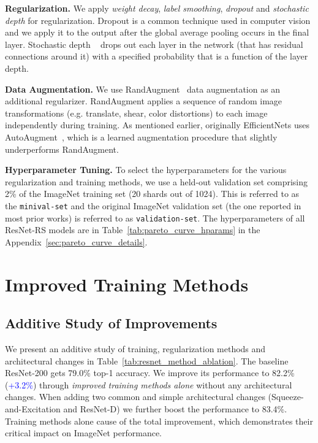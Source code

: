 \documentclass{article}
\begin{document}
\textbf{Regularization.}
We apply \emph{weight decay}, \emph{label smoothing}, \emph{dropout} and \emph{stochastic depth} for regularization. Dropout \cite{srivastava2014dropout} is a common technique used in computer vision and we apply it to the output after the global average pooling occurs in the final layer. 
Stochastic depth ~\cite{huang2016deep} drops out each layer in the network (that has residual connections around it) with a specified probability that is a function of the layer depth. 

\textbf{Data Augmentation.}
We use RandAugment~\cite{cubuk2019randaugment} data augmentation as an additional regularizer. 
RandAugment applies a sequence of random image transformations (e.g. translate, shear, color distortions) to each image independently during training.
As mentioned earlier, originally EfficientNets uses AutoAugment~\cite{cubuk2018autoaugment}, which is a learned augmentation procedure that slightly underperforms RandAugment.

\textbf{Hyperparameter Tuning.}
To select the hyperparameters for the various regularization and training methods, we use a held-out validation set comprising 2\% of the ImageNet training set (20 shards out of 1024).
This is referred to as the \texttt{minival-set} and the original ImageNet validation set (the one reported in most prior works) is referred to as \texttt{validation-set}. The hyperparameters of all ResNet-RS models are in Table~\ref{tab:pareto_curve_hparams} in the Appendix~\ref{sec:pareto_curve_details}. \section{Improved Training Methods\label{sec:training_setups}}

\subsection{Additive Study of Improvements}
We present an additive study of training, regularization methods and architectural changes in Table~\ref{tab:resnet_method_ablation}.
The baseline ResNet-200 gets 79.0\% top-1 accuracy.
We improve its performance to 82.2\% (\textcolor{blue}{+3.2\%}) through \emph{improved training methods alone} without any architectural changes.
When adding two common and simple architectural changes (Squeeze-and-Excitation and ResNet-D) we further boost the performance to 83.4\%. 
Training methods alone cause  of the total improvement, which demonstrates their critical impact on ImageNet performance.
\end{document}
